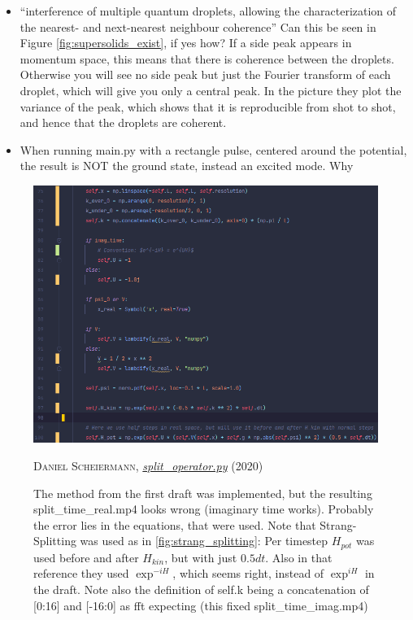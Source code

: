 \begin{itemize}
{}
        \item ``interference of multiple quantum droplets, allowing the characterization of the nearest- and next-nearest neighbour coherence'' Can this be seen in Figure \ref{fig:supersolids_exist}, if yes how?
                        {\color{red}
                        If a side peak appears in momentum space, this means that there is coherence between the droplets. Otherwise you will see no side peak but just the Fourier transform of each droplet, which will give you only a central peak. In the picture they plot the variance of the peak, which shows that it is reproducible from shot to shot, and hence that the droplets are coherent. 
}
        \item When running main.py with a rectangle pulse, centered around the potential, the result is NOT the ground state, instead an excited mode. Why

\end{itemize}


\begin{figure}[H]
    \centering
    \includegraphics[width=1.0\textwidth]{IMAGE/find_the_error.png}\\
    \caption{
      The method from the first draft was implemented, but the resulting split\_time\_real.mp4 looks wrong (imaginary time works). Probably the error lies in the equations, that were used. Note that Strang-Splitting was used as in \ref{fig:strang_splitting}: Per timestep $H_{pot}$ was used before and after $H_{kin}$, but with just $0.5dt$.
      Also in that reference they used $\exp^{-iH}$, which seems right, instead of $\exp^{iH}$ in the draft.
      Note also the definition of self.k being a concatenation of [0:16] and [-16:0] as fft expecting (this fixed split\_time\_imag.mp4)
    }
    \textsc{Daniel Scheiermann},
    \emph{\url{split_operator.py}} (2020)
    \label{fig:find_the_error}
\end{figure}


